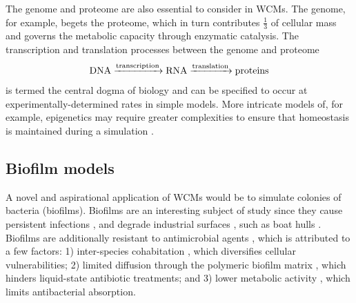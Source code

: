 The genome and proteome are also essential to consider in WCMs. The genome, for example, begets the proteome, which in turn contributes $\frac{1}{3}$ of cellular mass \cite{Vakser2019ComputationalCell} and governs the metabolic capacity through enzymatic catalysis. The transcription and translation processes between the genome and proteome
\begin{equation} \label{central_dogma}
    \ce{DNA ->[transcription] RNA ->[translation] proteins}
\end{equation}
is termed the central dogma of biology and can be specified to occur at experimentally-determined rates in simple models. More intricate models of, for example, epigenetics may require greater complexities to ensure that homeostasis is maintained during a simulation \cite{Karr2012}.

\subsection*{Biofilm models}
A novel and aspirational application of WCMs would be to simulate colonies of bacteria (biofilms). Biofilms  \cite{Otto2018StaphylococcalBiofilms,Mazza2016TheIntroduction} are an interesting subject of study since they cause persistent infections \cite{Metcalf2013BiofilmEvidence,Jamal2018BacterialInfections,Singhai2012AResistance,Coenye2007BiofilmFactors,Baldan2014AdaptationCo-infection, Kropec2005Poly-N-AcetylglucosamineInfection,Potera1999ForgingDisease,Ramsey2004PseudomonasEnvironments,Stewart2014BiophysicsInfection}, and degrade industrial surfaces \cite{Herzberg2007BiofoulingPressure,Herzberg2008PhysiologyAeruginosa,Matin2011BiofoulingPrevention}, such as boat hulls \cite{Schultz2011EconomicShip,1952ChapterFouling,Coetser2005BiofoulingSystems,Callow2002MarineProblem}. Biofilms are additionally resistant to antimicrobial agents \cite{Lewis2001RiddleResistance}, which is attributed to a few factors: 1) inter-species cohabitation \cite{Pereira2011SusceptibilityStudy}, which diversifies cellular vulnerabilities; 2) limited diffusion through the polymeric biofilm matrix \cite{Suci1994InvestigationBiofilms,Hoyle1992PseudomonasPiperacillin,LeChevallier1988InactivationBacteria,Dunne1993DiffusionBiofilm,DeBeer1994DirectDisinfection}, which hinders liquid-state antibiotic treatments; and 3) lower metabolic activity \cite{Mah2001MechanismsAgents,Sauer2004CharacterizationBiofilm,Suntharalingam2005QuorumFormation}, which limits antibacterial absorption.

